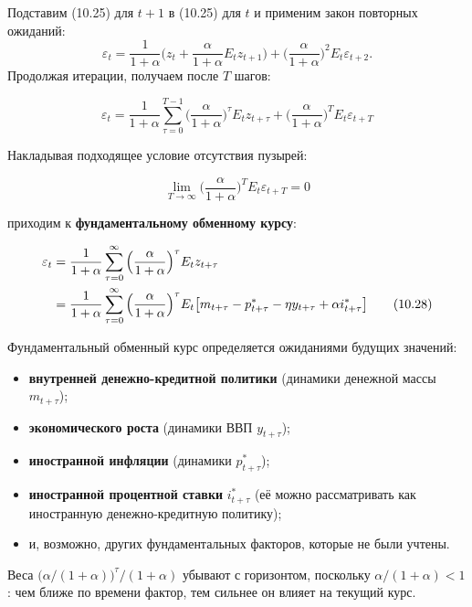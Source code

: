 \documentclass[10pt,a4paper]{article}
\begin{document}
Подставим (10.25) для $t+1$ в (10.25) для $t$ и применим закон повторных ожиданий:
$$\varepsilon_t = \frac{1}{1+\alpha}\Big(z_t + \frac{\alpha}{1+\alpha}E_t z_{t+1}\Big) + \Big(\frac{\alpha}{1+\alpha}\Big)^2E_t\varepsilon_{t+2}.$$
Продолжая итерации, получаем после $T$ шагов:
\begin{formulabox}
\begin{equation}
\varepsilon_t = \frac{1}{1+\alpha}\sum_{\tau=0}^{T-1}\Big(\frac{\alpha}{1+\alpha}\Big)^{\tau}E_t z_{t+\tau} + \Big(\frac{\alpha}{1+\alpha}\Big)^{T}E_t\varepsilon_{t+T} \tag{10.26}
\end{equation}
\end{formulabox}

Накладывая подходящее условие отсутствия пузырей:
\begin{formulabox}
\begin{equation}
\lim_{T\to\infty}\Big(\frac{\alpha}{1+\alpha}\Big)^{T}E_t\varepsilon_{t+T} = 0 \tag{10.27}
\end{equation}
\end{formulabox}
приходим к \textbf{фундаментальному обменному курсу}:
\begin{formulabox}
\begin{align}
\varepsilon_t &= \frac{1}{1+\alpha}\sum_{\tau=0}^{\infty}\Big(\frac{\alpha}{1+\alpha}\Big)^{\tau}E_t z_{t+\tau} \notag\\
&= \frac{1}{1+\alpha}\sum_{\tau=0}^{\infty}\Big(\frac{\alpha}{1+\alpha}\Big)^{\tau}E_t\big[m_{t+\tau}-p^{*}_{t+\tau}-\eta y_{t+\tau}+\alpha i^{*}_{t+\tau}\big] \tag{10.28}
\end{align}
\end{formulabox}

\begin{intuition}
Фундаментальный обменный курс определяется ожиданиями будущих значений:
\begin{itemize}[leftmargin=1.3em]
\item \textbf{внутренней денежно-кредитной политики} (динамики денежной массы $m_{t+\tau}$);
\item \textbf{экономического роста} (динамики ВВП $y_{t+\tau}$);
\item \textbf{иностранной инфляции} (динамики $p^{*}_{t+\tau}$);
\item \textbf{иностранной процентной ставки} $i^{*}_{t+\tau}$ (её можно рассматривать как иностранную денежно-кредитную политику);
\item и, возможно, других фундаментальных факторов, которые не были учтены.
\end{itemize}
Веса $\big(\alpha/(1+\alpha)\big)^\tau/(1+\alpha)$ убывают с горизонтом, поскольку $\alpha/(1+\alpha)<1$: чем ближе по времени фактор, тем сильнее он влияет на текущий курс.
\end{intuition}
\end{document}

